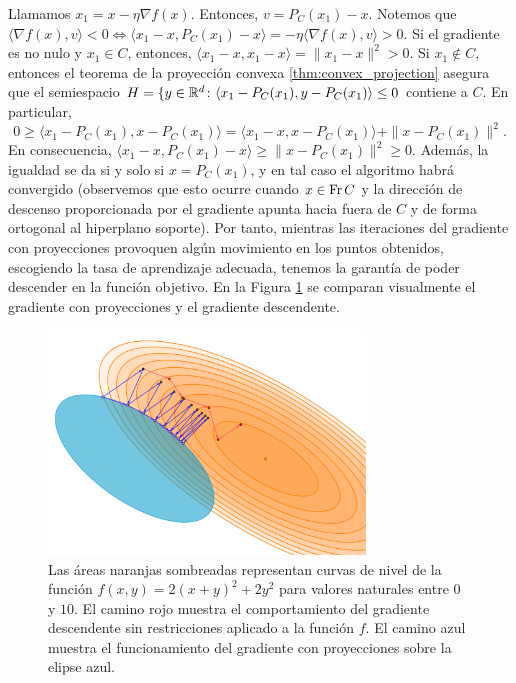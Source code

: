Llamamos $x_1 = x - \eta\nabla f(x)$. Entonces, $v = P_C(x_1) - x$. Notemos que $\langle \nabla f(x), v \rangle < 0 \iff \langle x_1 - x, P_C(x_1) - x \rangle = -\eta \langle \nabla f(x), v \rangle > 0$. Si el gradiente es no nulo y $x_1 \in C$, entonces, $\langle x_1 - x, x_1 - x \rangle = \|x_1 - x \|^2 > 0$. Si $x_1 \notin C$, entonces el teorema de la proyección convexa \ref{thm:convex_projection} asegura que el semiespacio $H = \{y \in \mathbb{R}^d \colon \langle x_1 - P_C(x_1), y - P_C(x_1) \rangle \le 0$ contiene a $C$. En particular,
\[ 0 \ge \langle x_1 - P_C(x_1), x - P_C(x_1) \rangle = \langle x_1 - x, x - P_C(x_1) \rangle + \|x - P_C(x_1)\|^2.  \]
En consecuencia, $ \langle x_1 - x, P_C(x_1) - x \rangle \ge \|x - P_C(x_1)\|^2 \ge 0$. Además, la igualdad se da si y solo si $x = P_C(x_1)$, y en tal caso el algoritmo habrá convergido (observemos que esto ocurre cuando $x \in \operatorname{Fr} C$ y la dirección de descenso proporcionada por el gradiente apunta hacia fuera de $C$ y de forma ortogonal al hiperplano soporte). Por tanto, mientras las iteraciones del gradiente con proyecciones provoquen algún movimiento en los puntos obtenidos, escogiendo la tasa de aprendizaje adecuada, tenemos la garantía de poder descender en la función objetivo. En la Figura \ref{fig:gradient} se comparan visualmente el gradiente con proyecciones y el gradiente descendente.

\begin{figure}[h]
    \centering
    \includegraphics[width=0.75\textwidth]{./images/gradient.png}
    \caption{Las áreas naranjas sombreadas representan curvas de nivel de la función $f(x,y) = 2(x+y)^2 + 2y^2$ para valores naturales entre $0$ y $10$. El camino rojo muestra el comportamiento del gradiente descendente sin restricciones aplicado a la función $f$. El camino azul muestra el funcionamiento del gradiente con proyecciones sobre la elipse azul.} \label{fig:gradient}
\end{figure}

